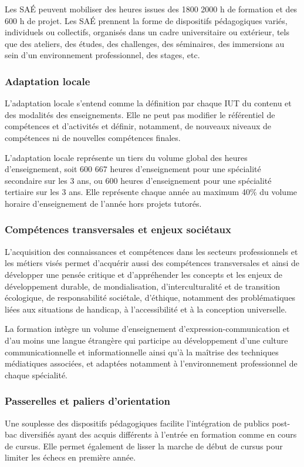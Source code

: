 \documentclass[10pt]{article}
\begin{document}
Les SAÉ peuvent mobiliser des heures issues des
1800
2000
h de formation et des 600 h de projet. Les SAÉ prennent la forme de
dispositifs pédagogiques variés, individuels ou collectifs, organisés
dans un cadre universitaire ou extérieur, tels que des ateliers, des
études, des challenges, des séminaires, des immersions au sein d'un
environnement professionnel, des stages, etc.

\subsubsection{Adaptation locale}
L’adaptation locale s’entend comme la définition par chaque IUT du contenu et des modalités des
enseignements. Elle ne peut pas modifier le référentiel de compétences et d’activités et définir,
notamment, de nouveaux niveaux de compétences ni de nouvelles compétences finales.

L’adaptation locale représente un tiers du volume global des heures d’enseignement, soit
600
667
heures d’enseignement pour une spécialité secondaire sur les 3 ans, ou
600 heures d’enseignement pour une spécialité tertiaire sur les 3
ans. Elle représente chaque année au maximum 40\% du volume horaire
d’enseignement de l’année hors projets tutorés.

\subsubsection{Compétences transversales et enjeux sociétaux}
L’acquisition des connaissances et compétences dans les secteurs
professionnels et les métiers visés permet d’acquérir aussi des
compétences transversales et ainsi de développer une pensée critique et
d’appréhender les concepts et les enjeux de développement durable, de
mondialisation, d’interculturalité et de transition écologique, de
responsabilité sociétale, d’éthique, notamment des problématiques liées
aux situations de handicap, à l’accessibilité et à la conception
universelle.

La formation intègre un volume d’enseignement d’expression-communication
et d’au moins une langue étrangère qui participe au développement d’une
culture communicationnelle et informationnelle ainsi qu’à la maîtrise
des techniques médiatiques associées, et adaptées notamment à
l’environnement professionnel de chaque spécialité.
\subsubsection{Passerelles et paliers d’orientation}
Une souplesse des dispositifs pédagogiques facilite l’intégration de
publics post-bac diversifiés ayant des acquis différents à l’entrée en
formation comme en cours de cursus. Elle permet également de lisser la
marche de début de cursus pour limiter les échecs en première année.
\end{document}
